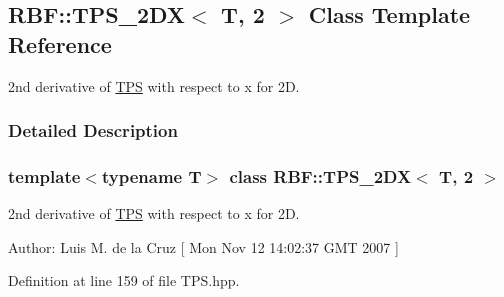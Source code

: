 \hypertarget{classRBF_1_1TPS__2DX_3_01T_00_012_01_4}{
\subsection{RBF::TPS\_\-2DX$<$ T, 2 $>$ Class Template Reference}
\label{classRBF_1_1TPS__2DX_3_01T_00_012_01_4}
}
2nd derivative of \hyperlink{classRBF_1_1TPS}{TPS} with respect to x for 2D.  




\subsubsection{Detailed Description}
\subsubsection*{template$<$typename T$>$ class RBF::TPS\_\-2DX$<$ T, 2 $>$}

2nd derivative of \hyperlink{classRBF_1_1TPS}{TPS} with respect to x for 2D. 

\begin{Desc}
\item[Author:]Luis M. de la Cruz \mbox{[} Mon Nov 12 14:02:37 GMT 2007 \mbox{]} \end{Desc}


Definition at line 159 of file TPS.hpp.